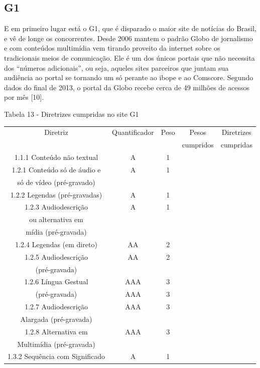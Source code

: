 \documentclass[a4paper]{article}
\begin{document}
\begin{titlepage}
\subsection{G1}

E em primeiro lugar está o G1, que é disparado o maior site de notícias do Brasil, e vê de longe os concorrentes. Desde 2006 mantem o padrão Globo de jornalismo e com conteúdos multimídia vem tirando proveito da internet sobre os tradicionais meios de comunicação. Ele é um dos únicos portais que não necessita dos “números adicionais”, ou seja, aqueles sites parceiros que juntam sua audiência ao portal se tornando um só perante ao ibope e ao Comscore. Segundo dados do final de 2013, o portal da Globo recebe cerca de 49 milhões de acessos por mês [10].

Tabela 13 - Diretrizes cumpridas no site G1\\[-1cm]
\begin{center}
	\fontsize{8pt}{8pt}\selectfont	
	\begin{longtable}{|c|c|c|c|c|}
		\hline
		Diretriz & Quantificador & Peso & Pesos & Diretrizes\\
		& & & cumpridos & cumpridas\\
		\hline
		1.1.1 Conteúdo não textual & A & 1 & & \\
		\hline
		1.2.1 Conteúdo só de áudio e & A & 1 & & \\
		só de vídeo (pré-gravado) & & & & \\
		\hline
		1.2.2 Legendas (pré-gravadas) & A & 1 & & \\
		\hline
		1.2.3 Audiodescrição & A & 1 & & \\
		ou alternativa em & & & & \\
		mídia (pré-gravada) & & & & \\
		\hline
		1.2.4 Legendas (em direto) & AA & 2 & & \\
		\hline
		1.2.5 Audiodescrição & AA & 2 & & \\
		(pré-gravada) & & & & \\
		\hline
		1.2.6 Língua Gestual & AAA & 3 & & \\
		(pré-gravada) & AAA & 3 & & \\
		\hline
		1.2.7 Audiodescrição & AAA & 3 & & \\
		Alargada (pré-gravada) & & & & \\
		\hline
		1.2.8 Alternativa em & AAA & 3 & & \\
		Multimídia (pré-gravada) & & & & \\
		\hline
		1.3.2 Sequência com Significado & A & 1 & & \\

\end{longtable}
\end{center}
\end{titlepage}
\end{document}
